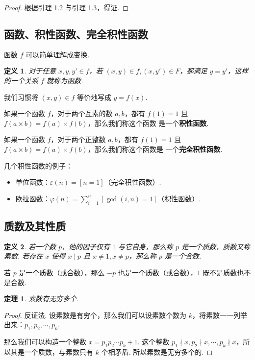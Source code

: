 \documentclass[a4paper]{article}
\newtheorem{theorem}{定理}[section]
\newtheorem{definition}{定义}[section]
\begin{document}
\begin{proof}
    根据引理 1.2 与引理 1.3，得证.
\end{proof}

\subsection{函数、积性函数、完全积性函数}

函数 $f$ 可以简单理解成变换.

\begin{definition}
    对于任意 $x,y,y'\in f$，若 $(x,y)\in f,(x,y')\in F$，都满足 $y=y'$，这样
    的一个关系 $f$ 就称为函数.
\end{definition}

我们习惯将 $(x,y)\in f$ 等价地写成 $y=f(x)$.

如果一个函数 $f$，对于两个互素的数 $a,b$，都有 $f(1)=1$ 且 $f(a\times b) = f(a)\times f(b)$，那么我们称这个函数
是一个\textbf{积性函数}.

如果一个函数 $f$，对于两个正整数 $a,b$，都有 $f(1)=1$ 且 $f(a\times b) = f(a)\times f(b)$，那么我们称这个函数是
一个\textbf{完全积性函数}.

几个积性函数的例子：

\begin{itemize}
    \item 单位函数：$\varepsilon(n)=[n=1]$（完全积性函数）.
    \item 欧拉函数：$\varphi(n)=\sum\limits_{i=1}^n[\gcd(i,n)=1]$（积性函数）.
\end{itemize}

\subsection{质数及其性质}

\begin{definition}
    若一个数 $p$，他的因子仅有 $1$ 与它自身，那么称 $p$ 是一个质数，质数又称素数. 若存在 $x$ 使得 $x\mid p$ 且 $x
        \ne 1,x\ne p$，那么称 $p$ 是一个合数.
\end{definition}

若 $p$ 是一个质数（或合数），那么 $-p$ 也是一个质数（或合数），$1$ 既不是质数也不是合数.

\begin{theorem}
    素数有无穷多个.
\end{theorem}

\begin{proof}
    反证法. 设素数是有穷个，那么我们可以设素数个数为 $k$，将素数一一列举出来：$p_1,p_2,\cdots,p_k$.

    那么我们可以构造一个整数 $x=p_1p_2\cdots p_k+1$. 这个整数 $p_1\nmid x,p_2\nmid x,\cdots,p_k\nmid x$，所
    以其是一个质数，与素数只有 $k$ 个相矛盾. 所以素数是无穷多个的.
\end{proof}
\end{document}

